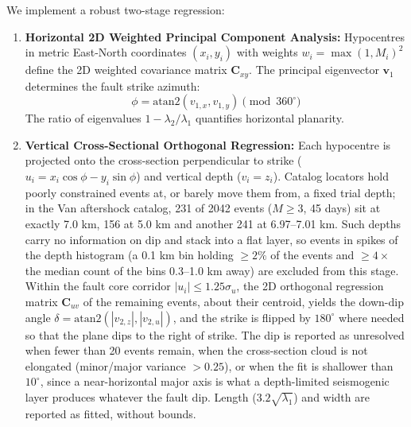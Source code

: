 \documentclass[11pt,a4paper]{article}
\begin{document}
We implement a robust two-stage regression:
\begin{enumerate}
    \item \textbf{Horizontal 2D Weighted Principal Component Analysis:} Hypocentres in metric East-North coordinates $(x_i, y_i)$ with weights $w_i = \max(1, M_i)^2$ define the 2D weighted covariance matrix $\mathbf{C}_{xy}$. The principal eigenvector $\mathbf{v}_1$ determines the fault strike azimuth:
    \begin{equation}
    \phi = \text{atan2}(v_{1,x}, v_{1,y}) \pmod{360^\circ}
    \end{equation}
    The ratio of eigenvalues $1 - \lambda_2/\lambda_1$ quantifies horizontal planarity.
    \item \textbf{Vertical Cross-Sectional Orthogonal Regression:} Each hypocentre is projected onto the cross-section perpendicular to strike ($u_i = x_i \cos\phi - y_i \sin\phi$) and vertical depth ($v_i = z_i$). Catalog locators hold poorly constrained events at, or barely move them from, a fixed trial depth; in the Van aftershock catalog, 231 of 2042 events ($M \ge 3$, 45 days) sit at exactly 7.0 km, 156 at 5.0 km and another 241 at 6.97--7.01 km. Such depths carry no information on dip and stack into a flat layer, so events in spikes of the depth histogram (a 0.1 km bin holding $\ge 2\%$ of the events and $\ge 4\times$ the median count of the bins 0.3--1.0 km away) are excluded from this stage. Within the fault core corridor $|u_i| \le 1.25\sigma_u$, the 2D orthogonal regression matrix $\mathbf{C}_{uv}$ of the remaining events, about their centroid, yields the down-dip angle $\delta = \text{atan2}(|v_{2,z}|, |v_{2,u}|)$, and the strike is flipped by $180^\circ$ where needed so that the plane dips to the right of strike. The dip is reported as unresolved when fewer than 20 events remain, when the cross-section cloud is not elongated (minor/major variance $> 0.25$), or when the fit is shallower than $10^\circ$, since a near-horizontal major axis is what a depth-limited seismogenic layer produces whatever the fault dip. Length ($3.2\sqrt{\lambda_1}$) and width are reported as fitted, without bounds.
\end{enumerate}
\end{document}
